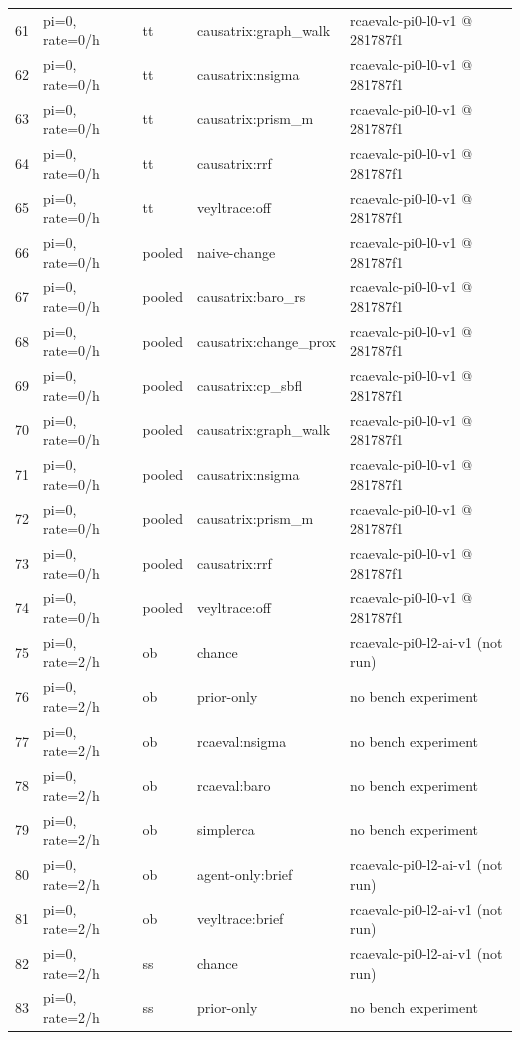 \begin{longtable}{@{}r>{\raggedright\arraybackslash}p{48.0pt}>{\raggedright\arraybackslash}p{18.0pt}>{\raggedright\arraybackslash}p{108.0pt}>{\raggedright\arraybackslash}p{105.0pt}@{}}
61 & pi=0, rate=0/h & tt & causatrix:graph\_walk & rcaevalc-pi0-l0-v1 @ 281787f1 \\
62 & pi=0, rate=0/h & tt & causatrix:nsigma & rcaevalc-pi0-l0-v1 @ 281787f1 \\
63 & pi=0, rate=0/h & tt & causatrix:prism\_m & rcaevalc-pi0-l0-v1 @ 281787f1 \\
64 & pi=0, rate=0/h & tt & causatrix:rrf & rcaevalc-pi0-l0-v1 @ 281787f1 \\
65 & pi=0, rate=0/h & tt & veyltrace:off & rcaevalc-pi0-l0-v1 @ 281787f1 \\
66 & pi=0, rate=0/h & pooled & naive-change & rcaevalc-pi0-l0-v1 @ 281787f1 \\
67 & pi=0, rate=0/h & pooled & causatrix:baro\_rs & rcaevalc-pi0-l0-v1 @ 281787f1 \\
68 & pi=0, rate=0/h & pooled & causatrix:change\_prox & rcaevalc-pi0-l0-v1 @ 281787f1 \\
69 & pi=0, rate=0/h & pooled & causatrix:cp\_sbfl & rcaevalc-pi0-l0-v1 @ 281787f1 \\
70 & pi=0, rate=0/h & pooled & causatrix:graph\_walk & rcaevalc-pi0-l0-v1 @ 281787f1 \\
71 & pi=0, rate=0/h & pooled & causatrix:nsigma & rcaevalc-pi0-l0-v1 @ 281787f1 \\
72 & pi=0, rate=0/h & pooled & causatrix:prism\_m & rcaevalc-pi0-l0-v1 @ 281787f1 \\
73 & pi=0, rate=0/h & pooled & causatrix:rrf & rcaevalc-pi0-l0-v1 @ 281787f1 \\
74 & pi=0, rate=0/h & pooled & veyltrace:off & rcaevalc-pi0-l0-v1 @ 281787f1 \\
75 & pi=0, rate=2/h & ob & chance & rcaevalc-pi0-l2-ai-v1 (not run) \\
76 & pi=0, rate=2/h & ob & prior-only & no bench experiment \\
77 & pi=0, rate=2/h & ob & rcaeval:nsigma & no bench experiment \\
78 & pi=0, rate=2/h & ob & rcaeval:baro & no bench experiment \\
79 & pi=0, rate=2/h & ob & simplerca & no bench experiment \\
80 & pi=0, rate=2/h & ob & agent-only:brief & rcaevalc-pi0-l2-ai-v1 (not run) \\
81 & pi=0, rate=2/h & ob & veyltrace:brief & rcaevalc-pi0-l2-ai-v1 (not run) \\
82 & pi=0, rate=2/h & ss & chance & rcaevalc-pi0-l2-ai-v1 (not run) \\
83 & pi=0, rate=2/h & ss & prior-only & no bench experiment \\

\end{longtable}
